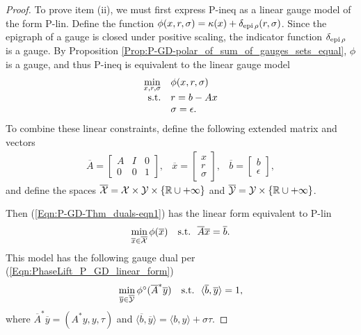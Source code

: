 \begin{enumerate}
\begin{proof}
To prove item (ii), we must first express P-ineq as a linear gauge model of the form P-lin.  Define the function $\phi(x, r, \sigma) = \kappa(x) + \delta_{\textnormal{epi} \hspace{0.05cm} \rho}(r, \sigma)$.  Since the epigraph of a gauge is closed under positive scaling, the indicator function $\delta_{\textnormal{epi} \hspace{0.05cm} \rho}$ is a gauge.  By Proposition \ref{Prop:P-GD-polar_of_sum_of_gauges_sets_equal}, $\phi$ is a gauge, and thus P-ineq is equivalent to the linear gauge model
\begin{equation}   			\label{Eqn:P-GD-Thm_duals-eqn1}
\begin{array}{rl}
\min\limits_{\substack{x, r, \sigma}} 
	&	\phi(x, r, \sigma)	\\
\textnormal{s.t.}
	&	r = b-Ax \\
	&	\sigma = \epsilon.
\end{array}
\end{equation}
To combine these linear constraints, define the following extended matrix and vectors
\begin{equation}
\begin{array}{lll}
\overline{A}
=	\begin{bmatrix}
		A	&	I	&	0	\\
		0	&	0	&	1
	\end{bmatrix},
	&	\overline{x} = \begin{bmatrix}
									x \\ r \\ \sigma
								\end{bmatrix},
	&	\overline{b}	=	\begin{bmatrix}
									b	\\	 \epsilon
								\end{bmatrix},
\end{array}	
\end{equation}
and define the spaces $\overline{{\mathcal X}} = {\mathcal X} \times {\mathcal Y} \times \{{\mathbb R} \cup +\infty\}$ and $\overline{{\mathcal Y}} = {\mathcal Y} \times \{{\mathbb R} \cup +\infty\}$.

Then (\ref{Eqn:P-GD-Thm_duals-eqn1}) has the linear form equivalent to P-lin
\begin{equation}
\begin{array}{rl}
\min\limits_{\substack{\overline{x} \in \overline{{\mathcal X}}}} \phi(\overline{x})
	&	\textnormal{s.t.} \ \ \overline{A}\overline{x} = \overline{b}.
\end{array}
\end{equation}
This model has the following gauge dual per (\ref{Eqn:PhaseLift_P_GD_linear_form})
\begin{equation}
\begin{array}{rl}
\min\limits_{\substack{\overline{y} \in \overline{{\mathcal Y}}}} \phi^\circ(\overline{A}^*\overline{y})
	&	\textnormal{s.t.} \ \ \langle \overline{b}, \overline{y} \rangle = 1,
\end{array}
\end{equation}
where $\overline{A}^*\overline{y} = (A^*y, y, \tau)$ and $\langle \overline{b}, \overline{y} \rangle = \langle b, y \rangle + \sigma \tau$.


\end{proof}
\end{enumerate}
